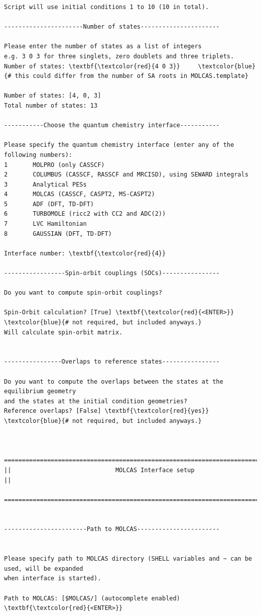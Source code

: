 \documentclass[a4paper,11pt,DIV=15,openany]{scrbook}
\begin{document}
\begin{oframed}
\begin{Verbatim}[commandchars=\\\{\}]
Script will use initial conditions 1 to 10 (10 in total).

----------------------Number of states----------------------

Please enter the number of states as a list of integers
e.g. 3 0 3 for three singlets, zero doublets and three triplets.
Number of states: \textbf{\textcolor{red}{4 0 3}}     \textcolor{blue}{# this could differ from the number of SA roots in MOLCAS.template}

Number of states: [4, 0, 3]
Total number of states: 13

-----------Choose the quantum chemistry interface-----------

Please specify the quantum chemistry interface (enter any of the following numbers):
1       MOLPRO (only CASSCF)
2       COLUMBUS (CASSCF, RASSCF and MRCISD), using SEWARD integrals
3       Analytical PESs
4       MOLCAS (CASSCF, CASPT2, MS-CASPT2)
5       ADF (DFT, TD-DFT)
6       TURBOMOLE (ricc2 with CC2 and ADC(2))
7       LVC Hamiltonian
8       GAUSSIAN (DFT, TD-DFT)

Interface number: \textbf{\textcolor{red}{4}}

-----------------Spin-orbit couplings (SOCs)----------------

Do you want to compute spin-orbit couplings?

Spin-Orbit calculation? [True] \textbf{\textcolor{red}{<ENTER>}}     \textcolor{blue}{# not required, but included anyways.}
Will calculate spin-orbit matrix.


----------------Overlaps to reference states----------------

Do you want to compute the overlaps between the states at the equilibrium geometry 
and the states at the initial condition geometries?
Reference overlaps? [False] \textbf{\textcolor{red}{yes}}    \textcolor{blue}{# not required, but included anyways.}


  ================================================================================
||                             MOLCAS Interface setup                             ||
  ================================================================================


-----------------------Path to MOLCAS-----------------------


Please specify path to MOLCAS directory (SHELL variables and ~ can be used, will be expanded 
when interface is started).

Path to MOLCAS: [$MOLCAS/] (autocomplete enabled) \textbf{\textcolor{red}{<ENTER>}}


\end{Verbatim}
\end{oframed}
\end{document}
